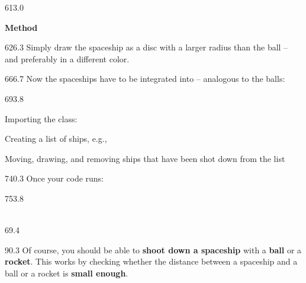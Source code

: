 \documentclass{aslab}
\newcommand*\codemd[1]{{\mdseries\codearg{#1}}}
\begin{document}
\begin{region}{613.0}
\begin{alist}[start=3,label={\bfseries(\Alph*)}]
\item \textbf{Method \codemd{draw(self)}}
\end{alist}
\end{region}

\begin{region}[x=74.7,right=0,pitch=13.2]{626.3}
Simply draw the spaceship as a disc with a larger radius than the ball -- and
preferably in a different color.
\end{region}

\begin{region}[pitch=13.6]{666.7}
Now the spaceships have to be integrated into  -- analogous
to the balls:
\end{region}

\begin{region}[pitch=13.4]{693.8}
\begin{ntasks}
\item Importing the class:\ \ 
\item Creating a list of ships, e.g., 
\item Moving, drawing, and removing ships that have been shot down from the
  list
\end{ntasks}
\end{region}

\begin{region}[pitch=13.5]{740.3}
Once your code runs:
\end{region}

\begin{region}[pitch=13.2]{753.8}
\\
\\
\end{region}

\nextpage
\begin{region}{69.4}
\end{region}

\begin{region}[pitch=13.7]{90.3}
Of course, you should be able to \textbf{shoot down a spaceship} with a
\textbf{ball} or a \textbf{rocket}. This works by checking whether the
distance between a spaceship and a ball or a rocket is \textbf{small enough}.
\end{region}
\end{document}
